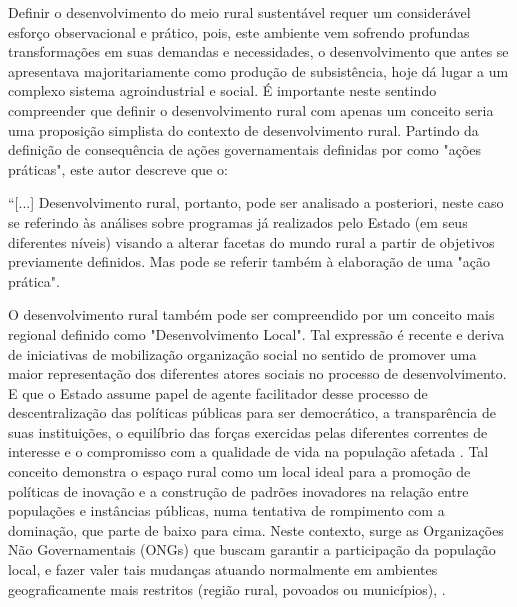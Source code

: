Definir o desenvolvimento do meio rural sustentável requer um considerável esforço observacional e prático, pois, este ambiente vem sofrendo profundas transformações em suas demandas e necessidades, o desenvolvimento que antes se apresentava majoritariamente como produção de subsistência, hoje dá lugar a um complexo sistema agroindustrial \cite{bastos_determinantes_2018} e social. É importante neste sentindo compreender que definir o desenvolvimento rural com apenas um conceito seria uma proposição simplista do contexto de desenvolvimento rural. Partindo da definição de consequência de ações governamentais definidas por  como "ações práticas", este autor descreve que o:

\begin{citacao}
“[...] Desenvolvimento rural, portanto, pode ser analisado a posteriori, neste caso se referindo às análises sobre programas já realizados pelo Estado (em seus diferentes níveis) visando a alterar facetas do mundo rural a partir de objetivos previamente definidos. Mas pode se referir também à elaboração de uma "ação prática".
\end{citacao}

O desenvolvimento rural também pode ser compreendido por um conceito mais regional definido como "Desenvolvimento Local". Tal expressão é recente e deriva de iniciativas de mobilização organização social no sentido de promover uma maior representação dos diferentes atores sociais no processo de desenvolvimento. E que o Estado assume papel de agente facilitador desse processo de descentralização das políticas públicas  para ser democrático, a transparência de suas instituições, o equilíbrio das forças exercidas pelas diferentes correntes de interesse e o compromisso com a qualidade de vida na população afetada \cite{campanhola_diretrizes_2000}. Tal conceito demonstra o espaço rural como um local ideal para a promoção de políticas de inovação e a construção de padrões inovadores na relação entre populações e instâncias públicas, numa tentativa de rompimento com a dominação, que parte de baixo para cima. Neste contexto, surge as Organizações Não Governamentais (ONGs) que buscam garantir a participação da população local, e fazer valer tais mudanças atuando normalmente em ambientes geograficamente mais restritos (região rural, povoados ou municípios), \cite{assis_agricultura_2005, campanhola_diretrizes_2000}.


